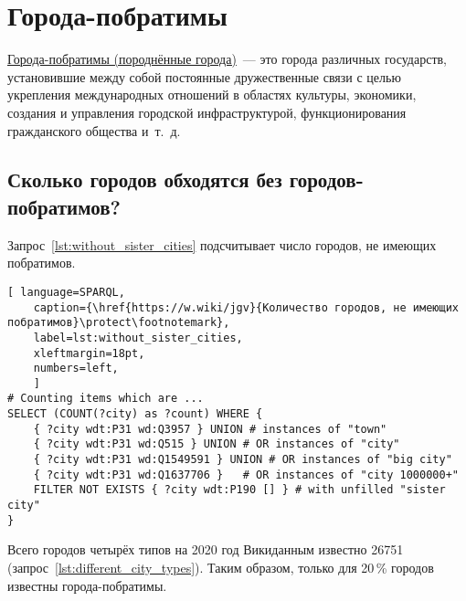 \section{Города-побратимы}

\href{https://w.wiki/pRe}{Города-побратимы (породнённые города)}~--- это города различных государств, установившие между собой постоянные дружественные связи с целью укрепления международных отношений в областях культуры, экономики, создания и управления городской инфраструктурой, 
функционирования гражданского общества и~т.~д.%



\subsection{Сколько городов обходятся без городов-побратимов?}

Запрос~\ref{lst:without_sister_cities} подсчитывает число городов, не имеющих побратимов.

\begin{lstlisting}[ language=SPARQL, 
    caption={\href{https://w.wiki/jgv}{Количество городов, не имеющих побратимов}\protect\footnotemark},
    label=lst:without_sister_cities,
    xleftmargin=18pt, 
    numbers=left,
    ]
# Counting items which are ... 
SELECT (COUNT(?city) as ?count) WHERE {                             
	{ ?city wdt:P31 wd:Q3957 } UNION # instances of "town"          
	{ ?city wdt:P31 wd:Q515 } UNION # OR instances of "city"                 
	{ ?city wdt:P31 wd:Q1549591 } UNION # OR instances of "big city"                       
	{ ?city wdt:P31 wd:Q1637706 } 	# OR instances of "city 1000000+"              
	FILTER NOT EXISTS { ?city wdt:P190 [] } # with unfilled "sister city"
}
\end{lstlisting}

Всего городов четырёх типов на 2020 год Викиданным известно \num{26751} (запрос~\ref{lst:different_city_types}). 
Таким образом, только для 20\,\% городов известны города-побратимы.

